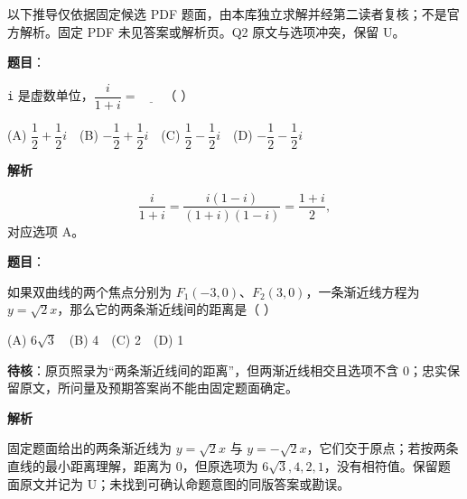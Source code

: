 

\begin{gktip}
以下推导仅依据固定候选 PDF 题面，由本库独立求解并经第二读者复核；不是官方解析。固定 PDF 未见答案或解析页。Q2 原文与选项冲突，保留 U。
\end{gktip}

\begin{answer}

\textbf{题目}：

\texttt{i} 是虚数单位，\(\dfrac{i}{1+i}=\underline{\qquad}\)（  ）

(A) \(\dfrac12+\dfrac12i\)　(B) \(-\dfrac12+\dfrac12i\)　(C) \(\dfrac12-\dfrac12i\)　(D) \(-\dfrac12-\dfrac12i\)

\textbf{解析}

\nopagebreak[4]
\[
\frac{i}{1+i}=\frac{i(1-i)}{(1+i)(1-i)}=\frac{1+i}{2},
\]
对应选项 A。


\end{answer}
\begin{answer}

\textbf{题目}：

如果双曲线的两个焦点分别为 \(F_1(-3,0)\)、\(F_2(3,0)\)，一条渐近线方程为 \(y=\sqrt2x\)，那么它的两条渐近线间的距离是（  ）

(A) \(6\sqrt3\)　(B) 4　(C) 2　(D) 1

\begin{gktip}
\textbf{待核}：原页照录为“两条渐近线间的距离”，但两渐近线相交且选项不含 0；忠实保留原文，所问量及预期答案尚不能由固定题面确定。
\end{gktip}

\textbf{解析}

固定题面给出的两条渐近线为 \(y=\sqrt2x\) 与 \(y=-\sqrt2x\)，它们交于原点；若按两条直线的最小距离理解，距离为 0，但原选项为 \(6\sqrt3,4,2,1\)，没有相符值。保留题面原文并记为 U；未找到可确认命题意图的同版答案或勘误。


\end{answer}
